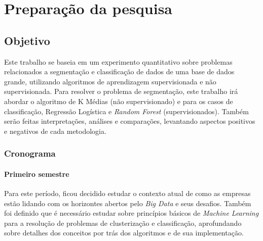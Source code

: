 
\part{Preparação da pesquisa}

\chapter{Objetivo}

Este trabalho se baseia em um experimento quantitativo sobre problemas relacionados a segmentação e classificação de dados de uma base de dados grande, utilizando algoritmos de aprendizagem supervisionada e não supervisionada. Para resolver o problema de segmentação, este trabalho irá abordar o algoritmo de K Médias (não supervisionado) e para os casos de classificação, Regressão Logística e \emph{Random Forest} (supervisionados). Também serão feitas interpretações, análises e comparações, levantando aspectos positivos e negativos de cada metodologia.

\section{Cronograma}

\subsection{Primeiro semestre}

Para este período, ficou decidido estudar o contexto atual de como as empresas estão lidando com os horizontes abertos pelo \emph{Big Data} e seus desafios. Também foi definido que é necessário estudar sobre princípios básicos de \emph{Machine Learning} para a resolução de problemas de clusterização e classificação, aprofundando sobre detalhes dos conceitos por trás dos algoritmos e de sua implementação.

